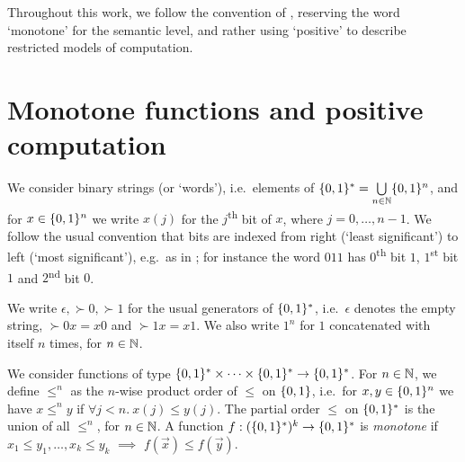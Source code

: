 \documentclass{lmcs}
\begin{document}
Throughout this work, we follow the convention of \cite{LautemannSS96:on-pos-p,LSS98}, reserving the word `monotone' for the semantic level, and rather using `positive' to describe restricted models of computation.

\section{Monotone functions and positive computation}
\label{sect:mon-fns}
\label{sect:posfp}

We consider binary strings (or `words'), i.e.\ elements of $\{0,1\}^* = \bigcup\limits_{n \in \mathbb{N}} \{0,1\}^n$, 
and for $x \in \{0,1\}^n$ we write $x(j)$ for the $j$\textsuperscript{th} bit of $x$, where $j= 0, \dots , n-1$.
We follow the usual convention that bits are indexed from right (`least significant') to left (`most significant'), e.g.\ as in \cite{CloKra02}; for instance the word $011$ has $0$\textsuperscript{th} bit $1$, $1$\textsuperscript{st} bit $1$ and $2$\textsuperscript{nd} bit $0$. 

We write $\epsilon, \succ 0 , \succ 1 $ for the usual generators of $\{0,1\}^*$, i.e.\ $\epsilon$ denotes the empty string, $\succ 0 x = x0$ and $\succ 1 x = x1$.
We also write $1^n$ for $1$ concatenated with itself $n$ times, for $n\in\mathbb{N}$.

We consider functions of type $\{0,1\}^* \times \cdots \times \{0,1\}^* \to \{0,1\}^*$.
For $n\in \mathbb{N}$, we define $\leq^n $ as the $n$-wise product order of $\leq $ on $\{0,1\}$, i.e.\ for $x, y \in \{0,1\}^n$ we have $x\leq^n y$ if $\forall j < n .\  x(j) \leq y(j)$.
%
%
The partial order $\leq $ on $\{0,1\}^*$ is the union of all $\leq^n$, for $n \in \mathbb{N}$.
A function $f : (\{0,1\}^* )^k \to \{0,1\}^*$ is \emph{monotone} if $x_1 \leq y_1 , \dots , x_k \leq y_k$ $\implies $ $f(\vec x) \leq f(\vec y)$.


\end{document}
